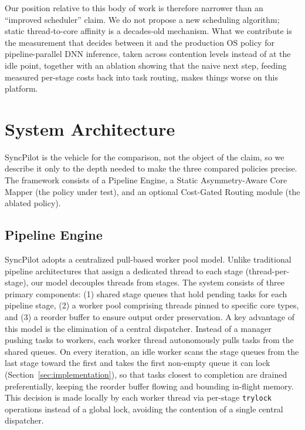 \documentclass[conference]{IEEEtran}
\begin{document}
Our position relative to this body of work is therefore narrower than an ``improved scheduler'' claim. We do not propose a new scheduling algorithm; static thread-to-core affinity is a decades-old mechanism. What we contribute is the measurement that decides between it and the production OS policy for pipeline-parallel DNN inference, taken across contention levels instead of at the idle point, together with an ablation showing that the naive next step, feeding measured per-stage costs back into task routing, makes things worse on this platform.

\section{System Architecture}
SyncPilot is the vehicle for the comparison, not the object of the claim, so we describe it only to the depth needed to make the three compared policies precise. The framework consists of a Pipeline Engine, a Static Asymmetry-Aware Core Mapper (the policy under test), and an optional Cost-Gated Routing module (the ablated policy).

\subsection{Pipeline Engine}
SyncPilot adopts a centralized pull-based worker pool model. Unlike traditional pipeline architectures that assign a dedicated thread to each stage (thread-per-stage), our model decouples threads from stages.
The system consists of three primary components: (1) shared stage queues that hold pending tasks for each pipeline stage, (2) a worker pool comprising threads pinned to specific core types, and (3) a reorder buffer to ensure output order preservation.
A key advantage of this model is the elimination of a central dispatcher. Instead of a manager pushing tasks to workers, each worker thread autonomously pulls tasks from the shared queues. On every iteration, an idle worker scans the stage queues from the last stage toward the first and takes the first non-empty queue it can lock (Section~\ref{sec:implementation}), so that tasks closest to completion are drained preferentially, keeping the reorder buffer flowing and bounding in-flight memory. This decision is made locally by each worker thread via per-stage \texttt{trylock} operations instead of a global lock, avoiding the contention of a single central dispatcher.
\end{document}
